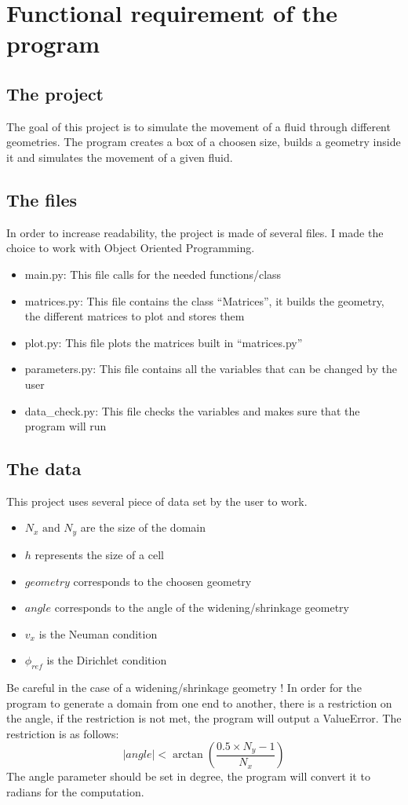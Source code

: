 \section{Functional requirement of the program}
\subsection{The project}
The goal of this project is to simulate the movement of a fluid through
different geometries. The program creates a box of a choosen size, builds a
geometry inside it and simulates the movement of a given fluid.

\subsection{The files}
In order to increase readability, the project is made of several files.
I made the choice to work with Object Oriented Programming.
\begin{itemize}
    \item main.py: This file calls for the needed functions/class
    \item matrices.py: This file contains the class ``Matrices'', it builds the
          geometry, the different matrices to plot and stores them
    \item plot.py: This file plots the matrices built in ``matrices.py''
    \item parameters.py: This file contains all the variables that can be 
          changed by the user
    \item data\_check.py: This file checks the variables and makes sure that
          the program will run
\end{itemize}

\subsection{The data}
This project uses several piece of data set by the user to work.
\begin{itemize}
    \item $N_x \text{ and } N_y$ are the size of the domain
    \item $h$ represents the size of a cell
    \item $geometry$ corresponds to the choosen geometry
    \item $angle$ corresponds to the angle of the widening/shrinkage geometry
    \item $v_x$ is the Neuman condition
    \item $\phi_{ref}$ is the Dirichlet condition
\end{itemize}
Be careful in the case of a widening/shrinkage geometry !
In order for the program to generate a domain from one end to another, there is
a restriction on the angle, if the restriction is not met, the program will
output a ValueError. The restriction is as follows:
\[
      |angle| < \arctan{\left(\dfrac{0.5 \times N_y - 1}{N_x}\right)}
\]
The angle parameter should be set in degree, the program will convert it to
radians for the computation.

